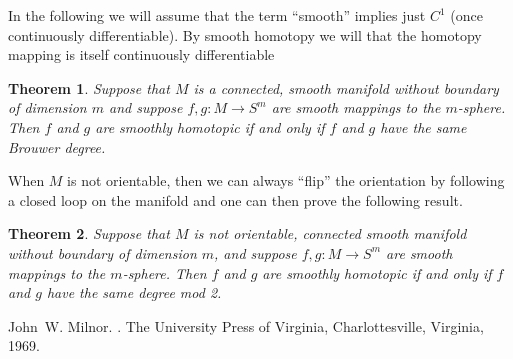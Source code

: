 \documentclass[12pt]{article}
\theoremstyle{theorem}
\newtheorem*{thm}{Theorem}
\theoremstyle{definition}
\begin{document}
In the following we will assume that the term ``smooth'' implies just $C^1$ (once continuously differentiable).  By smooth homotopy we will  that the homotopy mapping is itself continuously differentiable

\begin{thm}
Suppose that $M$ is a connected,  smooth manifold without boundary of dimension $m$ and suppose $f,g \colon M \to S^m$ are smooth mappings to the $m$-sphere.  Then $f$ and $g$ are smoothly homotopic if and only if $f$ and $g$ have the same Brouwer degree.
\end{thm}

When $M$ is not orientable, then we can always ``flip'' the orientation by following a closed loop on the manifold and one can then prove the following
result.

\begin{thm}
Suppose that $M$ is not orientable, connected smooth manifold without boundary
of dimension $m$, and suppose $f,g \colon M \to S^m$ are smooth mappings to
the $m$-sphere.
Then $f$ and $g$ are smoothly homotopic if and only if $f$ and $g$ have the
same degree mod 2.
\end{thm}

\begin{thebibliography}{9}
John~W. Milnor.
{\em {}}.
The University Press of Virginia, Charlottesville, Virginia, 1969.
\end{thebibliography}
\end{document}

